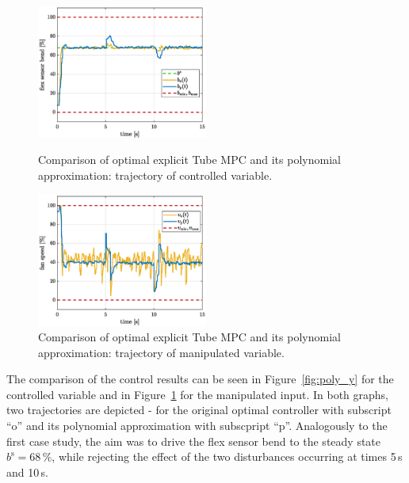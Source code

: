\documentclass[letterpaper, 10 pt, conference]{ieeeconf}
\begin{document}
\begin{figure}[bp!]
	\begin{center}
		\includegraphics[width=0.5\textwidth]{images/poly_b.eps}
		\caption{Comparison of optimal explicit Tube MPC and its polynomial approximation: trajectory of controlled variable.}
		\label{fig:poly_y}
	\end{center}
	\begin{center}
		\includegraphics[width=0.5\textwidth]{images/poly_v.eps}
		\caption{Comparison of optimal explicit Tube MPC and its polynomial approximation: trajectory of manipulated variable.}
		\label{fig:poly_u}
	\end{center}
\end{figure}


The comparison of the control results can be seen in Figure~\ref{fig:poly_y} for the controlled variable and in Figure~\ref{fig:poly_u} for the manipulated input. In both graphs, two trajectories are depicted - for the original optimal controller with subscript ``o'' and its polynomial approximation with subscpript ``p''. Analogously to the first case study, the aim was to drive the flex sensor bend to the steady state $ b^\mathrm{s} = 68\,\%$, while rejecting the effect of the two disturbances occurring at times 5\,s and 10\,s.
\end{document}
